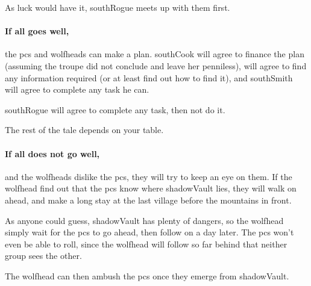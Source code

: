 As luck would have it, \gls{southRogue} meets up with them first.

\paragraph{If all goes well,}
the \glspl{pc} and \glspl{wolfhead} can make a plan.
\Gls{southCook} will agree to finance the plan (assuming the troupe did not conclude  and leave her penniless),  will agree to find any information required (or at least find out how to find it), and \gls{southSmith} will agree to complete any task he can.

\Gls{southRogue} will agree to complete any task, then not do it.

The rest of the tale depends on your table.

\paragraph{If all does not go well,}
and the \glspl{wolfhead} dislike the \glspl{pc}, they will try to keep an eye on them.
If the \gls{wolfhead} find out that the \glspl{pc} know where \gls{shadowVault} lies, they will walk on ahead, and make a long stay at the last \gls{village} before the mountains in front.

As anyone could guess, \gls{shadowVault} has plenty of dangers, so the \gls{wolfhead} simply wait for the \glspl{pc} to go ahead, then follow on a day later.
The \glspl{pc} won't even be able to roll, since the \gls{wolfhead} will follow so far behind that neither group sees the other.

The \gls{wolfhead} can then ambush the \glspl{pc} once they emerge from \gls{shadowVault}.

